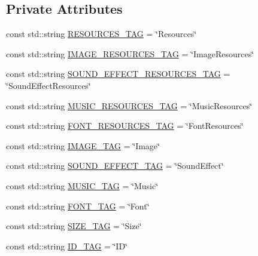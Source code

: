 \subsection*{Private Attributes}
\begin{DoxyCompactItemize}
\item 
const std\-::string \hyperlink{classn8_1_1_resource_manager_aa8b18502df6a0b62127137c683d07f1c}{R\-E\-S\-O\-U\-R\-C\-E\-S\-\_\-\-T\-A\-G} = \char`\"{}Resources\char`\"{}
\item 
const std\-::string \hyperlink{classn8_1_1_resource_manager_a49db9fd91a84fdab02ddf86560677a72}{I\-M\-A\-G\-E\-\_\-\-R\-E\-S\-O\-U\-R\-C\-E\-S\-\_\-\-T\-A\-G} = \char`\"{}Image\-Resources\char`\"{}
\item 
const std\-::string \hyperlink{classn8_1_1_resource_manager_ad8a40ca4c1bfbd9ab2091a75ebf1d1b0}{S\-O\-U\-N\-D\-\_\-\-E\-F\-F\-E\-C\-T\-\_\-\-R\-E\-S\-O\-U\-R\-C\-E\-S\-\_\-\-T\-A\-G} = \char`\"{}Sound\-Effect\-Resources\char`\"{}
\item 
const std\-::string \hyperlink{classn8_1_1_resource_manager_a99df9f9f63f408c2173ded9cc234aee1}{M\-U\-S\-I\-C\-\_\-\-R\-E\-S\-O\-U\-R\-C\-E\-S\-\_\-\-T\-A\-G} = \char`\"{}Music\-Resources\char`\"{}
\item 
const std\-::string \hyperlink{classn8_1_1_resource_manager_aab02445c4198c8ffc987e19310b88264}{F\-O\-N\-T\-\_\-\-R\-E\-S\-O\-U\-R\-C\-E\-S\-\_\-\-T\-A\-G} = \char`\"{}Font\-Resources\char`\"{}
\item 
const std\-::string \hyperlink{classn8_1_1_resource_manager_a5070a7664d8876080169bb19d67c981e}{I\-M\-A\-G\-E\-\_\-\-T\-A\-G} = \char`\"{}Image\char`\"{}
\item 
const std\-::string \hyperlink{classn8_1_1_resource_manager_adddc8602373da08bf20c073087856f39}{S\-O\-U\-N\-D\-\_\-\-E\-F\-F\-E\-C\-T\-\_\-\-T\-A\-G} = \char`\"{}Sound\-Effect\char`\"{}
\item 
const std\-::string \hyperlink{classn8_1_1_resource_manager_a1ad23bd82f0c2b5ec4cda6b3f7c200f5}{M\-U\-S\-I\-C\-\_\-\-T\-A\-G} = \char`\"{}Music\char`\"{}
\item 
const std\-::string \hyperlink{classn8_1_1_resource_manager_a629c37bbc7cab402c22138873c447e76}{F\-O\-N\-T\-\_\-\-T\-A\-G} = \char`\"{}Font\char`\"{}
\item 
const std\-::string \hyperlink{classn8_1_1_resource_manager_ab2d2c6626b2c68384f1d400c17d1b38f}{S\-I\-Z\-E\-\_\-\-T\-A\-G} = \char`\"{}Size\char`\"{}
\item 
const std\-::string \hyperlink{classn8_1_1_resource_manager_a2893f0f975614d26af2b61e139d9acbe}{I\-D\-\_\-\-T\-A\-G} = \char`\"{}I\-D\char`\"{}

\end{DoxyCompactItemize}
